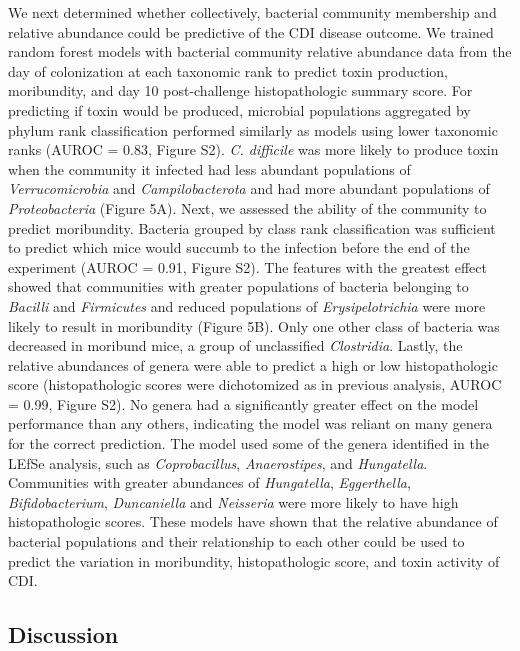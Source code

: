 \documentclass[
  12pt,
]{article}
\begin{document}
We next determined whether collectively, bacterial community membership
and relative abundance could be predictive of the CDI disease outcome.
We trained random forest models with bacterial community relative
abundance data from the day of colonization at each taxonomic rank to
predict toxin production, moribundity, and day 10 post-challenge
histopathologic summary score. For predicting if toxin would be
produced, microbial populations aggregated by phylum rank classification
performed similarly as models using lower taxonomic ranks (AUROC = 0.83,
Figure S2). \emph{C. difficile} was more likely to produce toxin when
the community it infected had less abundant populations of
\emph{Verrucomicrobia} and \emph{Campilobacterota} and had more abundant
populations of \emph{Proteobacteria} (Figure 5A). Next, we assessed the
ability of the community to predict moribundity. Bacteria grouped by
class rank classification was sufficient to predict which mice would
succumb to the infection before the end of the experiment (AUROC = 0.91,
Figure S2). The features with the greatest effect showed that
communities with greater populations of bacteria belonging to
\emph{Bacilli} and \emph{Firmicutes} and reduced populations of
\emph{Erysipelotrichia} were more likely to result in moribundity
(Figure 5B). Only one other class of bacteria was decreased in moribund
mice, a group of unclassified \emph{Clostridia}. Lastly, the relative
abundances of genera were able to predict a high or low histopathologic
score (histopathologic scores were dichotomized as in previous analysis,
AUROC = 0.99, Figure S2). No genera had a significantly greater effect
on the model performance than any others, indicating the model was
reliant on many genera for the correct prediction. The model used some
of the genera identified in the LEfSe analysis, such as
\emph{Coprobacillus}, \emph{Anaerostipes}, and \emph{Hungatella}.
Communities with greater abundances of \emph{Hungatella},
\emph{Eggerthella}, \emph{Bifidobacterium}, \emph{Duncaniella} and
\emph{Neisseria} were more likely to have high histopathologic scores.
These models have shown that the relative abundance of bacterial
populations and their relationship to each other could be used to
predict the variation in moribundity, histopathologic score, and toxin
activity of CDI.

\hypertarget{discussion}{%
\subsection{Discussion}\label{discussion}}
\end{document}
